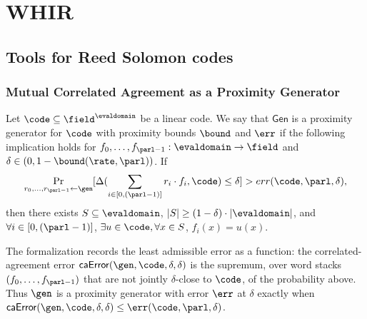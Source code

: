 
\section{WHIR}

\subsection{Tools for Reed Solomon codes}

\subsubsection{Mutual Correlated Agreement as a Proximity Generator}

\begin{definition}\label{def:proximity_generator}
\leanok
{}
Let $\code\subseteq \field^{\evaldomain}$ be a linear code. We say that $\mathsf{Gen}$ is a proximity generator for $\code$ with proximity bounds ${\bound}$ and $\err$ if the following implication holds for $f_0,\ldots,f_{\parl-1} : \evaldomain \rightarrow \field$ and $\delta\in(0,1-{\bound}(\rate,\parl))$. If
\begin{align*}
    \Pr_{r_0,\ldots,r_{\parl-1}\leftarrow \gen}[\Delta(\sum_{i\in[0,(\parl-1)]} r_i \cdot f_i, \code) \le \delta] > err(\code,\parl,\delta),
\end{align*}
then there exists $S\subseteq \evaldomain$, $|S|\ge(1-\delta)\cdot|\evaldomain|$, and
$\forall i \in [0, (\parl-1)]$, $\exists u \in \code, \forall x \in S$, $f_i(x)=u(x)$.

The formalization records the least admissible error as a function: the correlated-agreement
error $\mathsf{caError}(\gen,\code,\delta,\delta)$ is the supremum, over word stacks
$(f_0,\ldots,f_{\parl-1})$ that are not jointly $\delta$-close to $\code$, of the probability
above. Thus $\gen$ is a proximity generator with error $\err$ at $\delta$ exactly when
$\mathsf{caError}(\gen,\code,\delta,\delta)\le\err(\code,\parl,\delta)$.
\end{definition}

